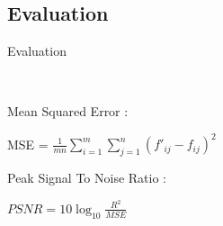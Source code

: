 \documentclass{beamer}
\begin{document}
	
	 
	
	
	
	







\subsection{Evaluation}
\begin{frame}{Evaluation}

\

Mean Squared Error :
\begin{center}

\vspace{0.8cm}

	    MSE = $\frac{1}{mn}{\sum_{i=1}^{m}\sum_{j=1}^{n}(f'_{ij}-f_{ij})^2}$ 
\end{center}
\vspace{1cm}

Peak Signal To Noise Ratio : 
\begin{center}

\vspace{0.8cm}

$PSNR = 10 \log_{10}\frac{R^2}{MSE}$
\end{center}
 

\end{frame}
\end{document}
